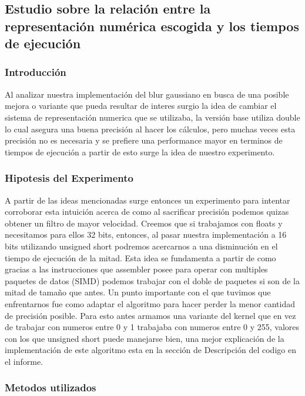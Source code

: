 \subsection{Estudio sobre la relación entre la representación numérica escogida y los tiempos de ejecución}

\subsubsection{Introducción}

Al analizar nuestra implementación del blur gaussiano en busca de una posible
mejora o variante que pueda resultar de interes surgio la idea de cambiar el
sistema de representación numerica que se utilizaba, la versión base utiliza
double lo cual asegura una buena precisión al hacer los cálculos, pero muchas
veces esta precisión no es necesaria y se prefiere una performance mayor en
terminos de tiempos de ejecución a partir de esto surge la idea de nuestro
experimento.

\subsubsection{Hipotesis del Experimento}

A partir de las ideas mencionadas surge entonces un experimento para intentar
corroborar esta intuición acerca de como al sacrificar precisión podemos quizas
obtener un filtro de mayor velocidad. Creemos que si trabajamos con floats y
necesitamos para ellos 32 bits, entonces, al pasar nuestra implementación a 16
bits utilizando unsigned short podremos acercarnos a una disminución en el
tiempo de ejecución de la mitad. Esta idea se fundamenta a partir de como
gracias a las instrucciones que assembler posee para operar con multiples
paquetes de datos (SIMD) podemos trabajar con el doble de paquetes si son de la
mitad de tamaño que antes. Un punto importante con el que tuvimos que
enfrentarnos fue como adaptar el algoritmo para hacer perder la menor cantidad
de precisión posible. Para esto antes armamos una variante del kernel que en vez
de trabajar con numeros entre 0 y 1 trabajaba con numeros entre 0 y 255, valores
con los que unsigned short puede manejarse bien, una mejor explicación de la
implementación de este algoritmo esta en la sección de Descripción del codigo en
el informe.

\subsubsection{Metodos utilizados}

